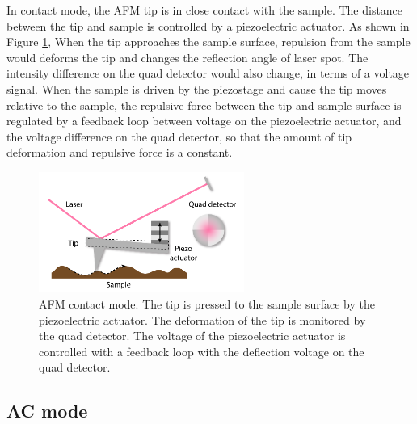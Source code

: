\documentclass[pdflatex, sectionletters, 12pt]{pittetd}    %
\begin{document}
In contact mode, the AFM tip is in close contact with the sample. The distance between the tip and sample is controlled by a piezoelectric actuator. As shown in Figure \ref{FIG:ContactAFM}, When the tip approaches the sample surface, repulsion from the sample would deforms the tip and changes the reflection angle of laser spot. The intensity difference on the quad detector would also change, in terms of a voltage signal. When the sample is driven by the piezostage and cause the tip moves relative to the sample, the repulsive force between the tip and sample surface is regulated by a feedback loop between voltage on the piezoelectric actuator, and the voltage difference on the quad detector, so that the amount of tip deformation and repulsive force is a constant. 

\begin{figure}[h!]
	\centering
	\includegraphics[width=0.6\textwidth]{Drawing/ContactAFM.pdf}
	\caption{AFM contact mode. The tip is pressed to the sample surface by the piezoelectric actuator. The deformation of the tip is monitored by the quad detector. The voltage of the piezoelectric actuator is controlled with a feedback loop with the deflection voltage on the quad detector.}
	\label{FIG:ContactAFM}
\end{figure}


\subsection{AC mode}
\end{document}
